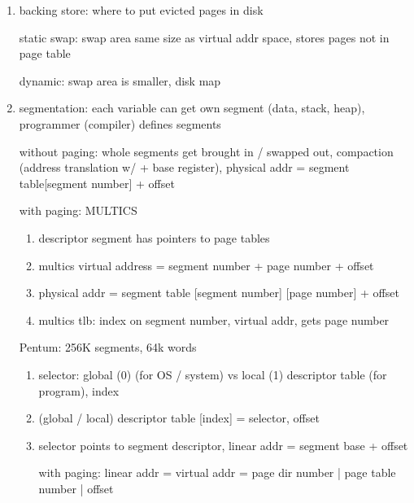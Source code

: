 \documentclass[10pt]{article}
\begin{document}
\begin{enumerate}
        \begin{enumerate}
            \item instruction backup: page fault vauses instruction to stop halfway through,
                OS doesn't know where to restart


            \item A does IO + gets suspended, B gets page fault (global page replacemnet), claims file A is using for IO

                pinning: lock page

                kernel buffers for IO
        \end{enumerate}

    \item backing store: where to put evicted pages in disk

        static swap: swap area same size as virtual addr space, stores pages not in page table

        dynamic: swap area is smaller, disk map

    \item segmentation: each variable can get own segment (data, stack, heap), programmer (compiler) defines segments

        without paging: whole segments get brought in / swapped out, compaction (address translation w/ + base register), physical addr = segment table[segment number] + offset

        with paging: MULTICS
        \begin{enumerate}
            \item descriptor segment has pointers to page tables
            \item multics virtual address = segment number + page number + offset
            \item physical addr = segment table [segment number] [page number] + offset
            \item multics tlb: index on segment number, virtual addr, gets page number
        \end{enumerate}

        Pentum: 256K segments, 64k words
        \begin{enumerate}
            \item selector: global (0) (for OS / system) vs local (1) descriptor table (for program), index
            \item (global / local) descriptor table [index] = selector, offset
            \item selector points to segment descriptor, linear addr = segment base + offset

                with paging: linear addr = virtual addr = page dir number | page table number | offset
        \end{enumerate}
\end{enumerate}
\end{document}
